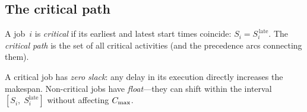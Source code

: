 \subsection{The critical path}
\label{ssec:critical-path}

\begin{definition}
\label{def:critical-path}
A job~$i$ is \emph{critical} if its earliest and latest start
times coincide: $S_i = S_i^{\,\text{late}}$.
The \emph{critical path} is the set of all critical activities
(and the precedence arcs connecting them).
\end{definition}

A critical job has \emph{zero slack}: any delay in its execution
directly increases the makespan.  Non-critical jobs have
\emph{float}---they can shift within the interval
$[S_i,\; S_i^{\text{late}}]$ without affecting $C_{\max}$.

